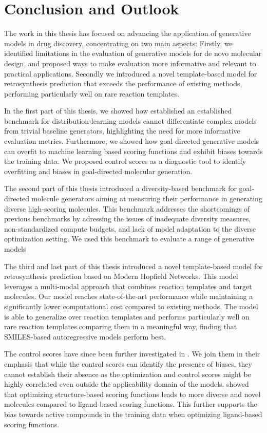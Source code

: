 \chapter{Conclusion and Outlook\label{chap:conclusion}} The work in this thesis has focused on
advancing the application of generative models in drug discovery, concentrating on two main aspects:
Firstly, we identified limitations in the evaluation of generative models for de novo molecular
design, and proposed ways to make evaluation more informative and relevant to practical
applications. Secondly we introduced a novel template-based model for retrosynthesis prediction that
exceeds the performance of existing methods, performing particularly well on rare reaction
templates.

In the first part of this thesis, we showed how established an established benchmark for
distribution-learning models cannot differentiate complex models from trivial baseline generators,
highlighting the need for more informative evaluation metrics. Furthermore, we showed how
goal-directed generative models can overfit to machine learning based scoring functions and exhibit
biases towards the training data. We proposed control scores as a diagnostic tool to identify
overfitting and biases in goal-directed molecular generation.

The second part of this thesis introduced a diversity-based benchmark for goal-directed molecule
generators aiming at measuring their performance in generating diverse high-scoring molecules.
This benchmark addresses the shortcomings of previous benchmarks by adressing the issues of
inadequate diversity measures, non-standardized compute budgets, and lack of model adaptation to the
diverse optimization setting. We used this benchmark to evaluate a range of generative models

The third and last part of this thesis introduced a novel template-based model for retrosynthesis prediction
based on Modern Hopfield Networks. This model leverages a multi-modal approach that combines
reaction templates and target molecules. Our model reaches state-of-the-art performance while
maintaining a significantly lower computational cost compared to existing methods. The model is able
to generalize over reaction templates and performs particularly well on rare reaction templates.comparing them in a meaningful way, finding that SMILES-based autoregressive models perform best.

The control scores have since been further investigated in \citep{turkMolecularAssaysSimulator2022}.
We join them in their emphasis that while the control scores can identify the presence of biases,
they cannot establish their absence as the optimization and control scores might be highly
correlated even outside the applicability domain of the models. \citet{thomasComparisonStructureLigandbased2021}
showed that optimizing structure-based scoring functions leads to more diverse and novel molecules
compared to ligand-based scoring functions. This further supports the bias towards active compounds in the
training data when optimizing ligand-based scoring functions.

